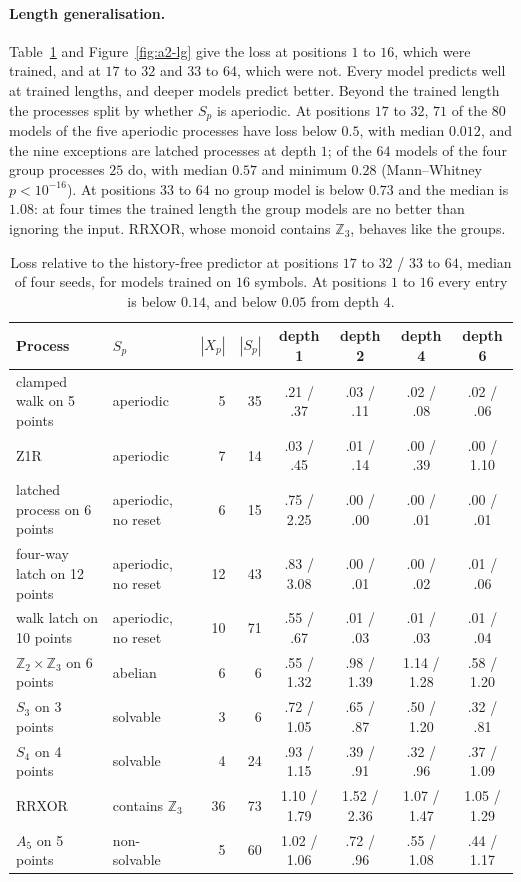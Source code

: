\documentclass[10pt]{article}
\theoremstyle{definition}
\theoremstyle{remark}
\begin{document}
\paragraph{Length generalisation.}
Table~\ref{tab:a2-lg} and Figure~\ref{fig:a2-lg} give the loss at
positions $1$ to $16$, which were trained, and at $17$ to $32$ and
$33$ to $64$, which were not.  Every model predicts well at trained
lengths, and deeper models predict better.  Beyond the trained
length the processes split by whether $S_p$ is aperiodic.  At
positions $17$ to $32$, $71$ of the $80$ models of the five
aperiodic processes have loss below $0.5$, with median $0.012$, and
the nine exceptions are latched processes at depth $1$; of the $64$
models of the four group processes $25$ do, with median $0.57$ and
minimum $0.28$ (Mann--Whitney $p<10^{-16}$).  At positions $33$ to
$64$ no group model is below $0.73$ and the median is $1.08$: at four
times the trained length the group models are no better than ignoring
the input.  RRXOR, whose monoid contains $\mathbb Z_3$, behaves like
the groups.

\begin{table}[ht]
\centering
\footnotesize
\begin{tabular}{llrrcccc}
\hline
Process & $S_p$ & $|X_p|$ & $|S_p|$ & depth 1 & depth 2 & depth 4 & depth 6\\
\hline
clamped walk on 5 points & aperiodic & 5 & 35 &
  .21 / .37 & .03 / .11 & .02 / .08 & .02 / .06\\
Z1R & aperiodic & 7 & 14 &
  .03 / .45 & .01 / .14 & .00 / .39 & .00 / 1.10\\
latched process on 6 points & aperiodic, no reset & 6 & 15 &
  .75 / 2.25 & .00 / .00 & .00 / .01 & .00 / .01\\
four-way latch on 12 points & aperiodic, no reset & 12 & 43 &
  .83 / 3.08 & .00 / .01 & .00 / .02 & .01 / .06\\
walk latch on 10 points & aperiodic, no reset & 10 & 71 &
  .55 / .67 & .01 / .03 & .01 / .03 & .01 / .04\\
$\mathbb Z_2\times\mathbb Z_3$ on 6 points & abelian & 6 & 6 &
  .55 / 1.32 & .98 / 1.39 & 1.14 / 1.28 & .58 / 1.20\\
$S_3$ on 3 points & solvable & 3 & 6 &
  .72 / 1.05 & .65 / .87 & .50 / 1.20 & .32 / .81\\
$S_4$ on 4 points & solvable & 4 & 24 &
  .93 / 1.15 & .39 / .91 & .32 / .96 & .37 / 1.09\\
RRXOR & contains $\mathbb Z_3$ & 36 & 73 &
  1.10 / 1.79 & 1.52 / 2.36 & 1.07 / 1.47 & 1.05 / 1.29\\
$A_5$ on 5 points & non-solvable & 5 & 60 &
  1.02 / 1.06 & .72 / .96 & .55 / 1.08 & .44 / 1.17\\
\hline
\end{tabular}
\caption{Loss relative to the history-free predictor at positions
$17$ to $32$ / $33$ to $64$, median of four seeds, for models trained
on $16$ symbols.  At positions $1$ to $16$ every entry is below
$0.14$, and below $0.05$ from depth $4$.}
\label{tab:a2-lg}
\end{table}
\end{document}
